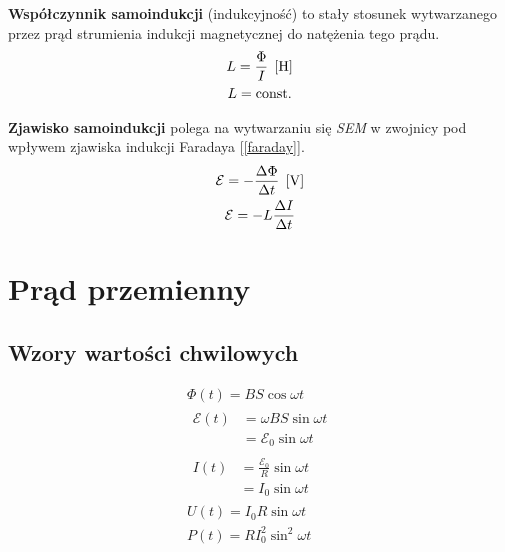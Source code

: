 \begin{definition}
  \textbf{Współczynnik samoindukcji} (indukcyjność) to stały stosunek wytwarzanego przez prąd
  strumienia indukcji magnetycznej do natężenia tego prądu.
  \begin{gather*}
    L = \frac\Phi I \;\left[\mathrm{H}\right]\\
    L = \operatorname{const.}
  \end{gather*}
\end{definition}

\begin{definition}
  \textbf{Zjawisko samoindukcji} polega na wytwarzaniu się \textit{SEM} w zwojnicy pod wpływem
  zjawiska indukcji Faradaya [\ref{faraday}].
  \begin{equation}
    \begin{gathered}
      \mathcal E = -\frac{\Delta\Phi}{\Delta t}\;\left[\mathrm{V}\right]\\
      \mathcal E = -L\frac{\Delta I}{\Delta t}
    \end{gathered}
  \end{equation}
\end{definition}

\section{Prąd przemienny}
\subsection{Wzory wartości chwilowych}
\begin{subequations}
  \begin{gather}
    \Phi(t) = BS\cos\omega t\\[10pt]
    \begin{aligned}
      \mathcal E(t) &= \omega BS\sin\omega t\\
      &= \mathcal E_0\sin\omega t
    \end{aligned}\\[10pt]
    \begin{aligned}
      I(t) &= \frac{\mathcal E_0}{R}\sin\omega t\\
      &= I_0\sin\omega t
    \end{aligned}\\[10pt]
    U(t) = I_0R\sin\omega t\\[10pt]
    P(t) = RI_0^2\sin^2\omega t
  \end{gather}
\end{subequations}

